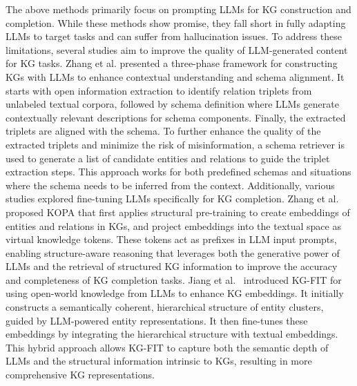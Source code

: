 The above methods primarily focus on prompting LLMs for KG construction and completion. While these methods show promise, they fall short in fully adapting LLMs to target tasks and can suffer from hallucination issues. To address these limitations, several studies aim to improve the quality of LLM-generated content for KG tasks. 
{Zhang et al. \cite{zhang2024extract} presented a three-phase framework for constructing KGs with LLMs to enhance contextual understanding and schema alignment. 
It starts with open information extraction to identify relation triplets from unlabeled textual corpora, followed by schema definition where LLMs generate contextually relevant descriptions for schema components. 
Finally, the extracted triplets are aligned with the schema.  
To further enhance the quality of the extracted
triplets and minimize the risk of misinformation, a schema retriever is used to generate a list of candidate entities and relations to guide the triplet extraction steps. This approach works for both predefined schemas and situations where the schema needs to be inferred from the context.
}
Additionally, various studies explored fine-tuning LLMs specifically for KG completion. Zhang et al.~\cite{kopa} proposed KOPA that first applies structural pre-training to create embeddings of entities and relations in KGs, and project embeddings into the textual space as virtual knowledge tokens. These tokens act as prefixes in LLM input prompts, enabling structure-aware reasoning that leverages both the generative power of LLMs and the retrieval of structured KG information to improve the accuracy and completeness of KG completion tasks. 
Jiang et al.~\citep{jiang2024kg} introduced KG-FIT for using open-world knowledge from LLMs to enhance KG embeddings. It initially constructs a semantically coherent, hierarchical structure of entity clusters, guided by LLM-powered entity representations. It then fine-tunes these embeddings by integrating the hierarchical structure with textual embeddings. This hybrid approach allows KG-FIT to capture both the semantic depth of LLMs and the structural information intrinsic to KGs, resulting in more comprehensive KG representations.



